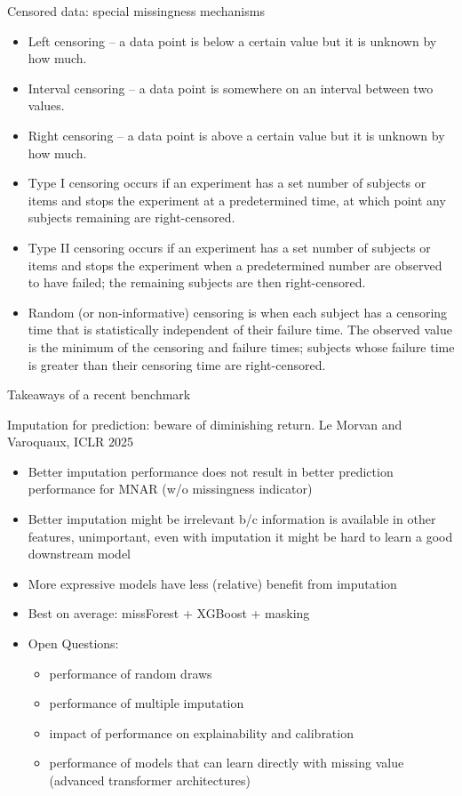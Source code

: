 \documentclass[10pt,compress,t,notes=noshow, xcolor=table]{beamer}
\begin{document}
\begin{frame}{Censored data: special missingness mechanisms}
    \small
    \begin{itemize}
        \item Left censoring – a data point is below a certain value but it is unknown by how much.
        \item Interval censoring – a data point is somewhere on an interval between two values.
        \item Right censoring – a data point is above a certain value but it is unknown by how much.
        \item Type I censoring occurs if an experiment has a set number of subjects or items and stops the experiment at a predetermined time, at which point any subjects remaining are right-censored.
        \item Type II censoring occurs if an experiment has a set number of subjects or items and stops the experiment when a predetermined number are observed to have failed; the remaining subjects are then right-censored.
        \item Random (or non-informative) censoring is when each subject has a censoring time that is statistically independent of their failure time. The observed value is the minimum of the censoring and failure times; subjects whose failure time is greater than their censoring time are right-censored.
    \end{itemize}
\end{frame}

\begin{frame}{Takeaways of a recent benchmark}

Imputation for prediction: beware of diminishing return. Le Morvan and Varoquaux, ICLR 2025 \href{https://arxiv.org/pdf/2407.19804}{}

\begin{itemize}
    \item Better imputation performance does not result in better prediction performance for MNAR (w/o missingness indicator)
    \item Better imputation might be irrelevant b/c information is available in other features, unimportant, even with imputation it might be hard to learn a good downstream model
    \item More expressive models have less (relative) benefit from imputation
    \item Best on average: missForest + XGBoost + masking
    \item Open Questions:
    \begin{itemize}
        \item performance of random draws
        \item performance of multiple imputation
        \item impact of performance on explainability and calibration
        \item performance of models that can learn directly with missing value (advanced transformer architectures)
    \end{itemize}
\end{itemize}
    
\end{frame}
\end{document}
